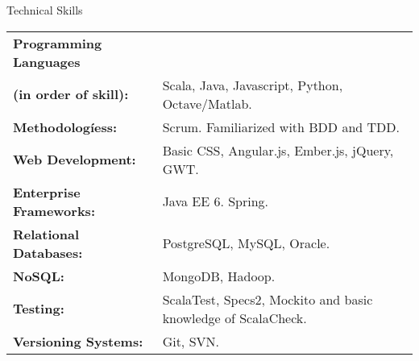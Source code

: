 \documentclass{resume} %
\begin{document}
\begin{rSection}{Technical Skills}

\begin{tabular}{ @{} >{\bfseries}l @{\hspace{6ex}} l }
Programming Languages & \\ \textbf{(in order of skill):}& Scala, Java, Javascript, Python, Octave/Matlab. \\
Methodolog\'iess: & Scrum. Familiarized with BDD and TDD. \\
Web Development:& Basic CSS, Angular.js, Ember.js, jQuery, GWT.\\
Enterprise Frameworks: & Java EE 6. Spring.\\%
Relational Databases: & PostgreSQL, MySQL, Oracle. \\
NoSQL: & MongoDB, Hadoop. \\
Testing: & ScalaTest, Specs2, Mockito and basic knowledge of ScalaCheck. \\
Versioning Systems: & Git, SVN. 
\end{tabular}

\end{rSection}





\end{document}

